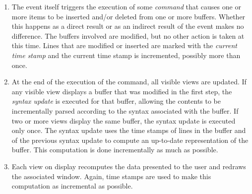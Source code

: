 \begin{enumerate}
\item The event itself triggers the execution of some \emph{command}
  that causes one or more items to be inserted and/or deleted from one
  or more buffers.  Whether this happens as a direct result or as an
  indirect result of the event makes no difference.  The buffers
  involved are modified, but no other action is taken at this time.
  Lines that are modified or inserted are marked with the
  \emph{current time stamp} and the current time stamp is
  incremented, possibly more than once. 
\item At the end of the execution of the command, all visible views
  are updated.  If any visible view displays a buffer that was
  modified in the first step, the \emph{syntax update} is executed for
  that buffer, allowing the contents to be incrementally parsed
  according to the syntax associated with the buffer.  If two or more
  views display the same buffer, the syntax update is executed only
  once.  The syntax update uses the time stamps of lines in the buffer
  and of the previous syntax update to compute an up-to-date
  representation of the buffer.  This computation is done
  incrementally as much as possible. 
\item Each view on display recomputes the data presented to the user
  and redraws the associated window.  Again, time stamps are used to
  make this computation as incremental as possible.
\end{enumerate}
